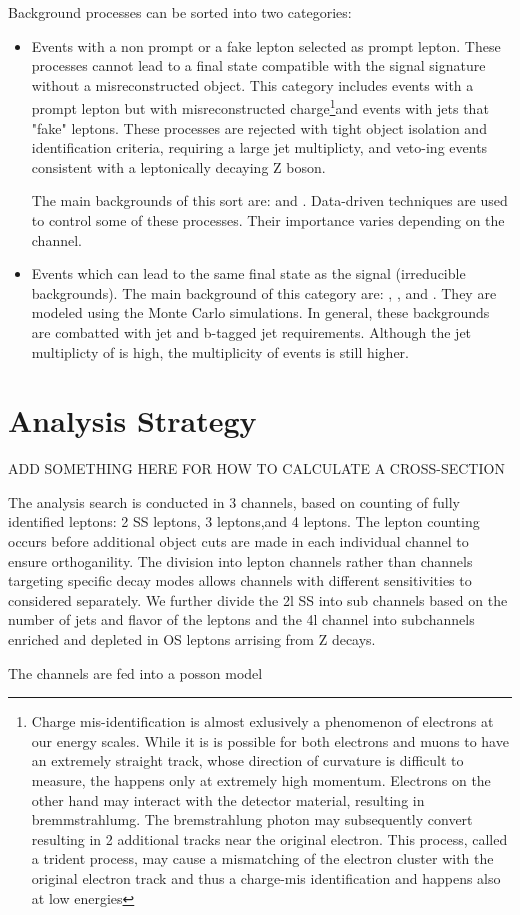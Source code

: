 Background processes can be sorted into two categories:

\begin{itemize}

\item Events with a non prompt or a fake lepton selected as prompt
  lepton. These processes cannot lead to a final state compatible with the
  signal signature without a misreconstructed object. This category includes
  events with a prompt lepton but with misreconstructed charge\footnote{Charge mis-identification is almost exlusively a phenomenon of electrons at our energy scales. While it is
  is possible for both electrons and muons to have an extremely straight track, whose direction of curvature is difficult to measure, the happens only at extremely high momentum. 
  Electrons on the other hand may interact with the detector material, resulting in bremmstrahlumg. The bremstrahlung photon may subsequently convert resulting in 2 additional
  tracks near the original electron. This process, called a trident process, may cause a mismatching of the electron cluster with the original electron track and thus
  a charge-mis identification and happens also at low energies}and events
  with jets that "fake" leptons.  These processes are rejected with tight object isolation and identification criteria, requiring a large jet multiplicty, and veto-ing events
  consistent with a leptonically decaying Z boson. 

  The main backgrounds of this sort are: \ttbar and \zj.
  Data-driven techniques are used to control some of these processes.
  Their importance varies depending on the channel.

\item Events which can lead to the same final state as the signal (irreducible
  backgrounds).
 The main background of this category are: \ttV, \WZ, and \ZZ.
 They are modeled using the Monte Carlo simulations. In general,
 these backgrounds are combatted with jet and b-tagged jet requirements. 
 Although the jet multiplicty of \ttV is high, the multiplicity of \tth 
 events is still higher. 

\end{itemize}


\section{Analysis Strategy} 


ADD SOMETHING HERE FOR HOW TO CALCULATE A CROSS-SECTION

The analysis search is conducted in 3 channels, based on counting of fully identified
leptons: 2 SS leptons, 3 leptons,and 4 leptons. The lepton counting occurs before additional object cuts are made in each individual 
channel to ensure orthoganility. The division into lepton channels rather than channels targeting specific decay modes
allows channels with different sensitivities to considered separately. We further divide the 2l SS into sub channels
based on the number of jets and flavor of the leptons and the 4l channel into subchannels enriched and depleted in OS leptons arrising from Z decays. 

The channels are fed into a posson model 



